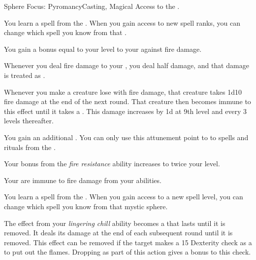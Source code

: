     \begin{feat}{Sphere Focus: Pyromancy}{Casting, Magical}
        \featpre Access to the  .

         You learn a spell from the  .
        When you gain access to new spell ranks, you can change which spell you know from that .

         You gain a bonus equal to your level to your  against fire damage.

         Whenever you deal fire damage to your , you deal half damage, and that damage is treated as .

         Whenever you make a creature lose  with fire damage, that creature takes 1d10 fire damage at the end of the next round.
        That creature then becomes immune to this effect until it takes a .
        This damage increases by \plus1d at 9th level and every 3 levels thereafter.

         You gain an additional .
        You can only use this attunement point to  to spells and rituals from the  .

         Your bonus from the \textit{fire resistance} ability increases to twice your level.

         Your  are immune to fire damage from your abilities.

         You learn a spell from the  .
        When you gain access to a new spell level, you can change which spell you know from that mystic sphere.

         The effect from your \textit{lingering chill} ability becomes a  that lasts until it is removed.
        It deals its damage at the end of each subsequent round until it is removed.
        This effect can be removed if the target makes a  15 Dexterity check as a  to put out the flames.
        Dropping  as part of this action gives a  bonus to this check.
    \end{feat}

